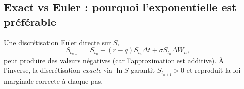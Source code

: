 \documentclass[11pt,a4paper]{report}
\theoremstyle{definition}
\theoremstyle{plain}
\theoremstyle{remark}
\newcommand{\1}{\mathbf{1}}
\newcommand{\Normal}{\mathcal{N}}
\begin{document}
\subsection*{Exact vs Euler : pourquoi l'exponentielle est préférable}
Une discrétisation Euler directe sur $S$,
\[
S_{t_{n+1}}=S_{t_n} + (r-q)S_{t_n}\Delta t + \sigma S_{t_n}\Delta W_n,
\]
peut produire des valeurs négatives (car l'approximation est additive).
À l'inverse, la discrétisation \emph{exacte} via $\ln S$ garantit $S_{t_{n+1}}>0$ et reproduit la loi marginale correcte à chaque pas.

\end{document}
